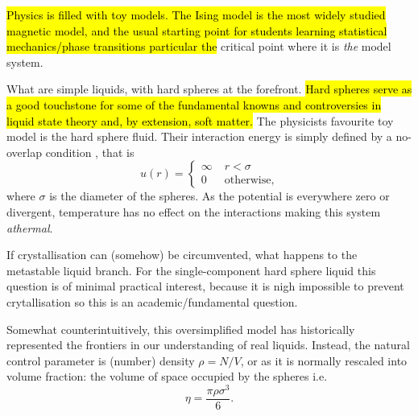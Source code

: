 \documentclass[11pt,twoside]{report}
\begin{document}
\hl{Physics is filled with toy models.
  The Ising model is the most widely studied magnetic model, and the usual starting point for students learning statistical mechanics/phase transitions particular the} critical point where it is \emph{the} model system.

What are simple liquids, with hard spheres at the forefront.
\hl{Hard spheres serve as a good touchstone for some of the fundamental knowns and controversies in liquid state theory and, by extension, soft matter.}
The physicists favourite toy model is the hard sphere fluid.
Their interaction energy is simply defined by a no-overlap condition%
,
that is
\begin{equation}\label{eq:hs-interaction}
  u(r) =
  \begin{cases}
    \infty & \; r < \sigma \\
    0 & \; \textrm{otherwise},
  \end{cases}
\end{equation}
where $\sigma$ is the diameter of the spheres.
As the potential is everywhere zero or divergent, temperature has no effect on the interactions making this system \emph{athermal}.

If crystallisation can (somehow) be circumvented, what happens to the metastable liquid branch.
For the single-component hard sphere liquid this question is of minimal practical interest, because it is nigh impossible to prevent crytallisation so this is an academic/fundamental question.

Somewhat counterintuitively, this oversimplified model has historically represented the frontiers in our understanding of real liquids.
Instead, the natural control parameter is (number) density $\rho = N/V$, or as it is normally rescaled into volume fraction: the volume of space occupied by the spheres i.e.\
\begin{equation}\label{eq:hs-volume-fraction}
  \eta
  =
  \frac{\pi \rho \sigma^3}{6}.
\end{equation}

\end{document}
